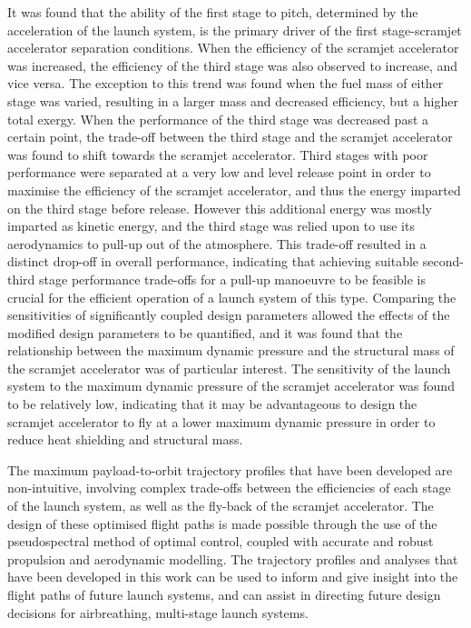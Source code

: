 It was found that the ability of the first stage to pitch, determined by the acceleration of the launch system, is the primary driver of the first stage-scramjet accelerator separation conditions. 
When the efficiency of the scramjet accelerator was increased, the efficiency of the third stage was also observed to increase, and vice versa. The exception to this trend was found when the fuel mass of either stage was varied, resulting in a larger mass and decreased efficiency, but a higher total exergy.
When the performance of the third stage was decreased past a certain point, the trade-off between the third stage and the scramjet accelerator was found to shift towards the scramjet accelerator. Third stages with poor performance were separated at a very low and level release point in order to maximise the efficiency of the scramjet accelerator, and thus the energy imparted on the third stage before release. However this additional energy was mostly imparted as kinetic energy, and the third stage was relied upon to use its aerodynamics to pull-up out of the atmosphere. This trade-off resulted in a distinct drop-off in overall performance, indicating that achieving suitable second-third stage performance trade-offs for a pull-up manoeuvre to be feasible is crucial for the efficient operation of a launch system of this type.  
Comparing the sensitivities of significantly coupled design parameters allowed the effects of the modified design parameters to be quantified, and it was found that the relationship between the maximum dynamic pressure and the structural mass of the scramjet accelerator was of particular interest. 
The sensitivity of the launch system to the maximum dynamic pressure of the scramjet accelerator was found to be relatively low, indicating that it may be advantageous to design the scramjet accelerator to fly at a lower maximum dynamic pressure in order to reduce heat shielding and structural mass. 

The maximum payload-to-orbit trajectory profiles that have been developed are non-intuitive, involving complex trade-offs between the efficiencies of each stage of the launch system, as well as the fly-back of the scramjet accelerator. The design of these optimised flight paths is made possible through the use of the pseudospectral method of optimal control, coupled with accurate and robust propulsion and aerodynamic modelling.  
The trajectory profiles and analyses that have been developed in this work can be used to inform and give insight into the flight paths of future launch systems, and can assist in directing future design decisions for airbreathing, multi-stage launch systems. 

